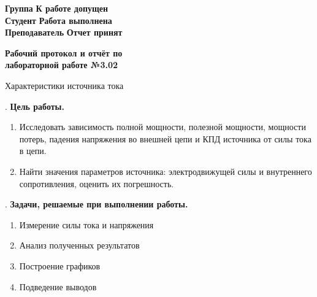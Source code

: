 \documentclass[12pt]{article}
\begin{document}
    \vspace*{2\baselineskip}

    \thispagestyle{fancy}

    \noindent
    \textbf{Группа} \underline{\hspace{4.85cm}} \hfill \textbf{К работе допущен} \underline{\hspace{4cm}} \\[0.5cm]
    \textbf{Студент} \underline{\hspace{4.6cm}} \hfill \textbf{Работа выполнена} \underline{\hspace{4cm}} \\[0.5cm]
    \textbf{Преподаватель} \underline{\hspace{3.2cm}} \hfill \textbf{Отчет принят} \underline{\hspace{4.85cm}} \\


    \begin{center}
    {\huge \textbf{Рабочий протокол и отчёт по\\ лабораторной работе №3.02}}

        \smallvspace

        {\Large Характеристики источника тока}
    \end{center}


    . \textbf{Цель работы.}

    \begin{enumerate}
        \item Исследовать зависимость полной мощности, полезной мощности,
        мощности потерь, падения напряжения во внешней цепи и КПД
        источника от силы тока в цепи.
        
        \item Найти значения параметров источника: электродвижущей силы и
        внутреннего сопротивления, оценить их погрешность.
    \end{enumerate}

    \mediumvspace

    . \textbf{Задачи, решаемые при выполнении работы.}


    \begin{enumerate}
        \item Измерение силы тока и напряжения
        \item Анализ полученных результатов
        \item Построение графиков 
        \item Подведение выводов
        
    \end{enumerate}
\end{document}
